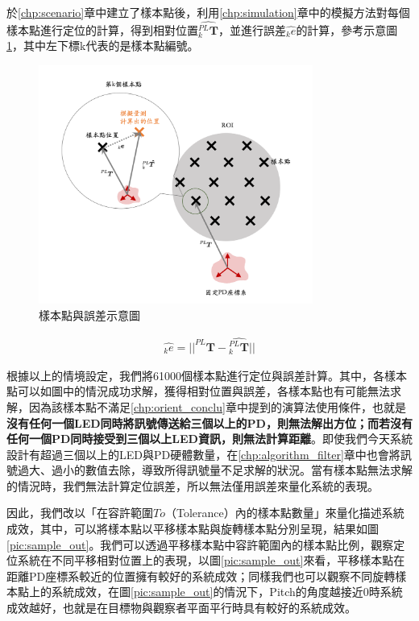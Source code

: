 於\ref{chp:scenario}章中建立了樣本點後，利用\ref{chp:simulation}章中的模擬方法對每個樣本點進行定位的計算，得到相對位置$\hat{_k^{PL}\boldsymbol{T}}$，並進行誤差$\hat{_k e}$的計算，參考示意圖\ref{pic:error_show}，其中左下標k代表的是樣本點編號。

\begin{figure}[htpb]
    \centering
    \includegraphics[width=9cm]{ch4pic/error.png}
    \caption{樣本點與誤差示意圖}
    \label{pic:error_show}
\end{figure}

\begin{gather}
    \label{eqn:sample_error}
    \hat{_k e} = ||^{PL}\boldsymbol{T}-\hat{^{PL}_k\boldsymbol{T}}||
\end{gather}



根據以上的情境設定，我們將61000個樣本點進行定位與誤差計算。其中，各樣本點可以如圖中的情況成功求解，獲得相對位置與誤差，各樣本點也有可能無法求解，因為該樣本點不滿足\ref{chp:orient_conclu}章中提到的演算法使用條件，也就是\textbf{沒有任何一個LED同時將訊號傳送給三個以上的PD，則無法解出方位；而若沒有任何一個PD同時接受到三個以上LED資訊，則無法計算距離}。即使我們今天系統設計有超過三個以上的LED與PD硬體數量，在\ref{chp:algorithm_filter}章中也會將訊號過大、過小的數值去除，導致所得訊號量不足求解的狀況。當有樣本點無法求解的情況時，我們無法計算定位誤差，所以無法僅用誤差來量化系統的表現。



因此，我們改以「在容許範圍$To$（Tolerance）內的樣本點數量」來量化描述系統成效，其中，可以將樣本點以平移樣本點與旋轉樣本點分別呈現，結果如圖\ref{pic:sample_out}。我們可以透過平移樣本點中容許範圍內的樣本點比例，觀察定位系統在不同平移相對位置上的表現，以圖\ref{pic:sample_out}來看，平移樣本點在距離PD座標系較近的位置擁有較好的系統成效；同樣我們也可以觀察不同旋轉樣本點上的系統成效，在圖\ref{pic:sample_out}的情況下，Pitch的角度越接近0時系統成效越好，也就是在目標物與觀察者平面平行時具有較好的系統成效。

